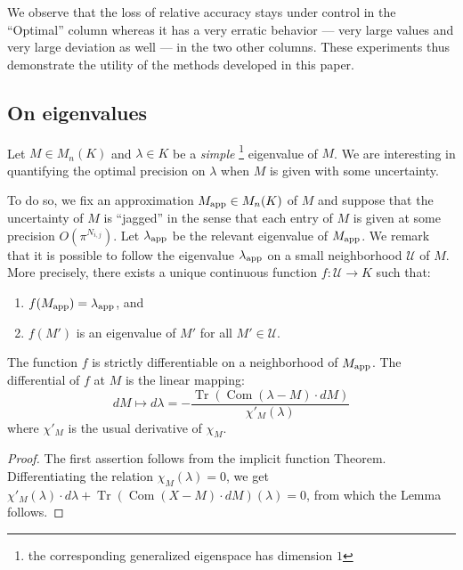 \documentclass{sig-alternate-05-2015}
\DeclareMathOperator{\tr}{Tr}
\DeclareMathOperator{\com}{Com}
\newcommand{\calU}{\mathcal{U}}
\newcommand{\app}{\text{\rm app}}
\begin{document}
We observe that the loss of relative accuracy stays under control in the 
``Optimal'' column whereas it has a very erratic behavior --- very large 
values and very large deviation as well --- in the two other columns. 
These experiments thus demonstrate the utility of the methods developed
in this paper.

\subsection{On eigenvalues}
\label{ssec:eigenvalues}

Let $M \in M_n(K)$ and $\lambda \in K$ be a \emph{simple}
\footnote{the corresponding generalized eigenspace has dimension $1$} eigenvalue 
of $M$. We are interesting in quantifying the optimal precision on 
$\lambda$ when $M$ is given with some uncertainty.

To do so, we fix an approximation $M_\app \in M_n(K)$ of $M$ and 
suppose that the uncertainty of $M$ is ``jagged'' in the sense that
each entry of $M$ is given at some precision $O(\pi^{N_{i,j}})$.
Let $\lambda_\app$ be the relevant eigenvalue of $M_\app$. We remark 
that it is possible to follow the eigenvalue $\lambda_\app$ on a small 
neighborhood $\calU$ of $M$. More precisely, there exists a unique continuous 
function $f : \calU \to K$ such that:
\begin{enumerate}[$\bullet$]
\renewcommand{\itemsep}{0pt}
\item $f(M_\app) = \lambda_\app$, and
\item $f(M')$ is an eigenvalue of $M'$ for all $M' \in \calU$.
\end{enumerate}

\begin{lem}
The function $f$ is strictly differentiable on a neighborhood of 
$M_\app$.
The differential of $f$ at $M$ is the linear mapping:
$$dM \mapsto d \lambda = - \frac{\tr(\com(\lambda-M) \cdot dM)}
{\chi'_M(\lambda)}$$
where $\chi'_M$ is the usual derivative of $\chi_M$.
\end{lem}

\begin{proof}
The first assertion follows from the implicit function Theorem.
Differentiating the relation $\chi_M(\lambda) = 0$, we get
$\chi'_M(\lambda) \cdot d \lambda + \tr(\com(X-M) \cdot dM)(\lambda) = 0$,
from which the Lemma follows.
\end{proof}
\end{document}
